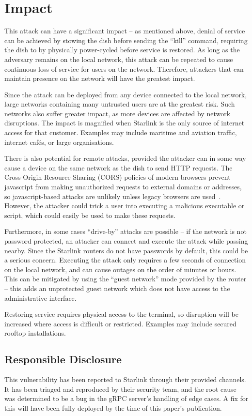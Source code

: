 \section{Impact}\label{sec:impact}

This attack can have a significant impact -- as mentioned above, denial of service can be achieved by stowing the dish before sending the ``kill'' command, requiring the dish to by physically power-cycled before service is restored.
As long as the adversary remains on the local network, this attack can be repeated to cause continuous loss of service for users on the network.
Therefore, attackers that can maintain presence on the network will have the greatest impact.

Since the attack can be deployed from any device connected to the local network, large networks containing many untrusted users are at the greatest risk.
Such networks also suffer greater impact, as more devices are affected by network disruptions.
The impact is magnified when Starlink is the only source of internet access for that customer.
Examples may include maritime and aviation traffic, internet cafés, or large organisations.

There is also potential for remote attacks, provided the attacker can in some way cause a device on the same network as the dish to send HTTP requests.
The Cross-Origin Resource Sharing (CORS) policies of modern browsers prevent javascript from making unauthorized requests to external domains or addresses, so javascript-based attacks are unlikely unless legacy browsers are used~\cite{cors}.
However, the attacker could trick a user into executing a malicious executable or script, which could easily be used to make these requests.

Furthermore, in some cases ``drive-by'' attacks are possible -- if the network is not password protected, an attacker can connect and execute the attack while passing nearby.
Since the Starlink routers do not have passwords by default, this could be a serious concern.
Executing the attack only requires a few seconds of connection on the local network, and can cause outages on the order of minutes or hours.
This can be mitigated by using the ``guest network'' mode provided by the router -- this adds an unprotected guest network which does not have access to the administrative interface.

Restoring service requires physical access to the terminal, so disruption will be increased where access is difficult or restricted.
Examples may include secured rooftop installations.


\subsection{Responsible Disclosure}\label{sec:responsible-disclosure}

This vulnerability has been reported to Starlink through their provided channels.
It has been triaged and reproduced by their security team, and the root cause was determined to be a bug in the gRPC server's handling of edge cases.
A fix for this will have been fully deployed by the time of this paper's publication.
